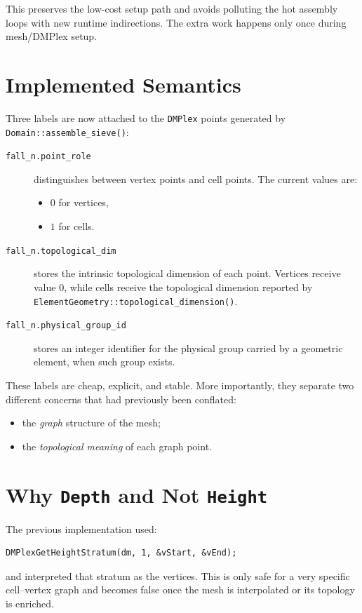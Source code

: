 This preserves the low-cost setup path and avoids polluting the hot assembly
loops with new runtime indirections. The extra work happens only once during
mesh/DMPlex setup.

\section{Implemented Semantics}

Three labels are now attached to the \texttt{DMPlex} points generated by
\texttt{Domain::assemble\_sieve()}:
\begin{description}
  \item[\texttt{fall\_n.point\_role}] distinguishes between vertex points and
        cell points. The current values are:
        \begin{itemize}
          \item $0$ for vertices,
          \item $1$ for cells.
        \end{itemize}
  \item[\texttt{fall\_n.topological\_dim}] stores the intrinsic topological
        dimension of each point. Vertices receive value $0$, while cells
        receive the topological dimension reported by
        \texttt{ElementGeometry::topological\_dimension()}.
  \item[\texttt{fall\_n.physical\_group\_id}] stores an integer identifier for
        the physical group carried by a geometric element, when such group
        exists.
\end{description}

These labels are cheap, explicit, and stable. More importantly, they separate
two different concerns that had previously been conflated:
\begin{itemize}
  \item the \emph{graph} structure of the mesh;
  \item the \emph{topological meaning} of each graph point.
\end{itemize}

\section{Why \texttt{Depth} and Not \texttt{Height}}

The previous implementation used:
\begin{verbatim}
DMPlexGetHeightStratum(dm, 1, &vStart, &vEnd);
\end{verbatim}
and interpreted that stratum as the vertices. This is only safe for a very
specific cell--vertex graph and becomes false once the mesh is interpolated or
its topology is enriched.

